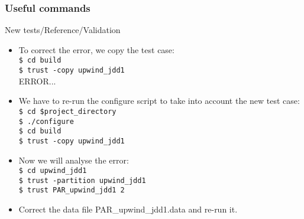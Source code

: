 \documentclass[10pt, hyperref={unicode=true,pdfusetitle, bookmarks=true,bookmarksnumbered=false,bookmarksopen=false, breaklinks=false,pdfborder={0 0 1},backref=true,colorlinks=true,linkcolor=darkblue,pageanchor, urlcolor=darkblue}]{beamer}
\begin{document}
\begin{frame}
\frametitle{Useful commands}
\begin{block}{New tests/Reference/Validation}

\begin{itemize}
\item To correct the error, we copy the test case:\\
\texttt{\$ cd build}\\
\texttt{\$ trust -copy upwind\_jdd1}\\
ERROR...
\item We have to re-run the configure script to take into account the new test case:\\
\texttt{\$ cd \$project\_directory}\\
\texttt{\$ ./configure}\\
\texttt{\$ cd build}\\
\texttt{\$ trust -copy upwind\_jdd1}


\item Now we will analyse the error:\\
\texttt{\$ cd upwind\_jdd1}\\
\texttt{\$ trust -partition upwind\_jdd1}\\
\texttt{\$ trust PAR\_upwind\_jdd1 2}\\
\item Correct the data file PAR\_upwind\_jdd1.data and re-run it.
\end{itemize}

\end{block}
\end{frame}
\end{document}
